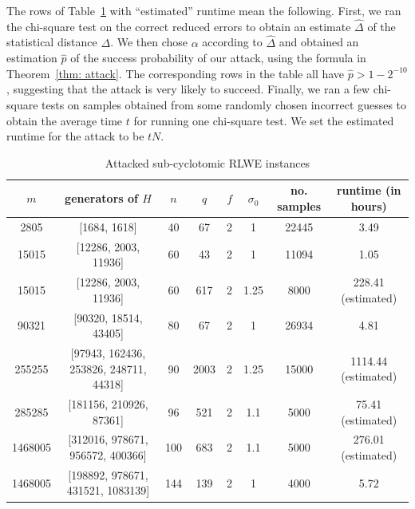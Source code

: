\documentclass[envcountsame]{llncs}
\begin{document}
The rows of Table~\ref{tab: attacked} with ``estimated'' runtime mean the following. First, we ran the chi-square test on the correct reduced errors to obtain an estimate $\hat{\Delta}$ of the statistical distance $\Delta$. We then chose $\alpha$ according to $\hat{\Delta}$ and obtained an estimation $\hat{p}$ of the success probability of our attack, using the formula in Theorem~\ref{thm: attack}.  The corresponding rows in the table all have $\hat{p} > 1 - 2^{-10}$, suggesting that the attack is very likely to succeed.  Finally, we ran a few chi-square tests on samples obtained from some randomly chosen incorrect guesses to obtain the average time $t$ for running one chi-square test. We set the estimated runtime for the attack to be $tN$.

\begin{table}
\caption{Attacked sub-cyclotomic RLWE instances}
\label{tab: attacked}
\begin{center}
\begin{tabular}{c|c|c|c|c|c|c|c}
$m$ & generators of $H$ & $n$ & $q$ & $f$ & $\sigma_0$ & no. samples & runtime (in hours) \\ \hline
2805 &  [1684, 1618] & 40 & 67 & 2 & 1 & 22445 & 3.49 \\
15015 & [12286, 2003, 11936] & 60 & 43 & 2 & 1 & 11094 & 1.05 \\
15015 & [12286, 2003, 11936] & 60 & 617 & 2 & 1.25 & 8000 & 228.41 (estimated)  \\
90321 & [90320, 18514, 43405] & 80 & 67 & 2 & 1 & 26934 & 4.81 \\
255255 &  [97943, 162436, 253826, 248711, 44318] & 90 & 2003 & 2 & 1.25 & 15000 &  1114.44 (estimated) \\
285285 & [181156, 210926, 87361] & 96 & 521  & 2 & 1.1 & 5000 & 75.41 (estimated) \\
1468005 & [312016, 978671, 956572, 400366] & 100 & 683 & 2 & 1.1
& 5000 &  276.01 (estimated) \\
1468005 & [198892, 978671, 431521, 1083139] & 144 & 139 & 2 & 1 &  4000 &  5.72
\end{tabular}
\end{center}
\end{table}

\end{document}

